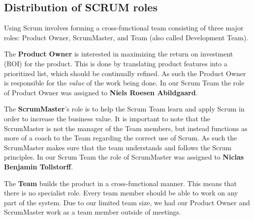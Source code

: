 \subsection{Distribution of SCRUM roles}

Using Scrum involves forming a cross-functional team consisting of three major roles: Product Owner, ScrumMaster, and Team (also called Development Team).

The \textbf{Product Owner} is interested in maximizing the return on investment (ROI) for the product. This is done by translating product features into a prioritized list, which should be continually refined. As such the Product Owner is responsible for the \textit{value} of the work being done. In our Scrum Team the role of Product Owner was assigned to \textbf{Niels Roesen Abildgaard}.

The \textbf{ScrumMaster}'s role is to help the Scrum Team learn and apply Scrum in order to increase the business value. It is important to note that the ScrumMaster is not the manager of the Team members, but instead functions as more of a coach to the Team regarding the correct use of Scrum. As such the ScrumMaster makes sure that the team understands and follows the Scrum principles. In our Scrum Team the role of ScrumMaster was assigned to \textbf{Niclas Benjamin Tollstorff}.

The \textbf{Team} builds the product in a cross-functional manner. This means that there is no specialist role. Every team member should be able to work on any part of the system. Due to our limited team size, we had our Product Owner and ScrumMaster work as a team member outside of meetings.